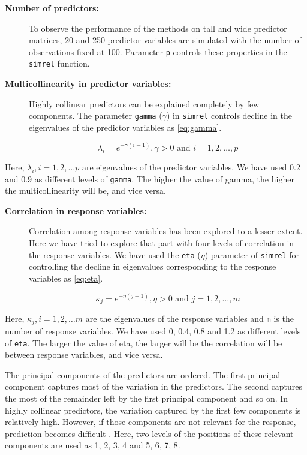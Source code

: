 \documentclass[review]{elsarticle}
\providecommand{\tightlist}{%
  \setlength{\itemsep}{0pt}\setlength{\parskip}{0pt}}
\begin{document}
\begin{description}
\item[\textbf{Number of predictors:}]
To observe the performance of the methods on tall and wide predictor
matrices, 20 and 250 predictor variables are simulated with the number
of observations fixed at 100. Parameter \texttt{p} controls these
properties in the \texttt{simrel} function.
\item[\textbf{Multicollinearity in predictor variables:}]
Highly collinear predictors can be explained completely by few
components. The parameter \texttt{gamma} (\(\gamma\)) in \texttt{simrel}
controls decline in the eigenvalues of the predictor variables as
\eqref{eq:gamma}.

\begin{equation}
  \lambda_i = e^{-\gamma(i - 1)}, \gamma > 0 \text{ and } i = 1, 2, \ldots, p
  \label{eq:gamma}
\end{equation}
\end{description}

Here, \(\lambda_i, i = 1, 2, \ldots p\) are eigenvalues of the predictor
variables. We have used 0.2 and 0.9 as different levels of
\texttt{gamma}. The higher the value of gamma, the higher the
multicollinearity will be, and vice versa.

\begin{description}
\item[\textbf{Correlation in response variables:}]
Correlation among response variables has been explored to a lesser
extent. Here we have tried to explore that part with four levels of
correlation in the response variables. We have used the \texttt{eta}
(\(\eta\)) parameter of \texttt{simrel} for controlling the decline in
eigenvalues corresponding to the response variables as \eqref{eq:eta}.

\begin{equation}
  \kappa_j = e^{-\eta(j - 1)}, \eta > 0 \text{ and } j = 1, 2, \ldots, m
  \label{eq:eta}
\end{equation}
\end{description}

Here, \(\kappa_j, i = 1, 2, \ldots m\) are the eigenvalues of the
response variables and \texttt{m} is the number of response variables.
We have used 0, 0.4, 0.8 and 1.2 as different levels of \texttt{eta}.
The larger the value of eta, the larger will be the correlation will be
between response variables, and vice versa.

\begin{description}
\tightlist
\item[\textbf{Position of predictor components relevant to the
response:}]
The principal components of the predictors are ordered. The first
principal component captures most of the variation in the predictors.
The second captures the most of the remainder left by the first
principal component and so on. In highly collinear predictors, the
variation captured by the first few components is relatively high.
However, if those components are not relevant for the response,
prediction becomes difficult \citep{Helland1994b}. Here, two levels of
the positions of these relevant components are used as 1, 2, 3, 4 and 5,
6, 7, 8.
\end{description}
\end{document}
